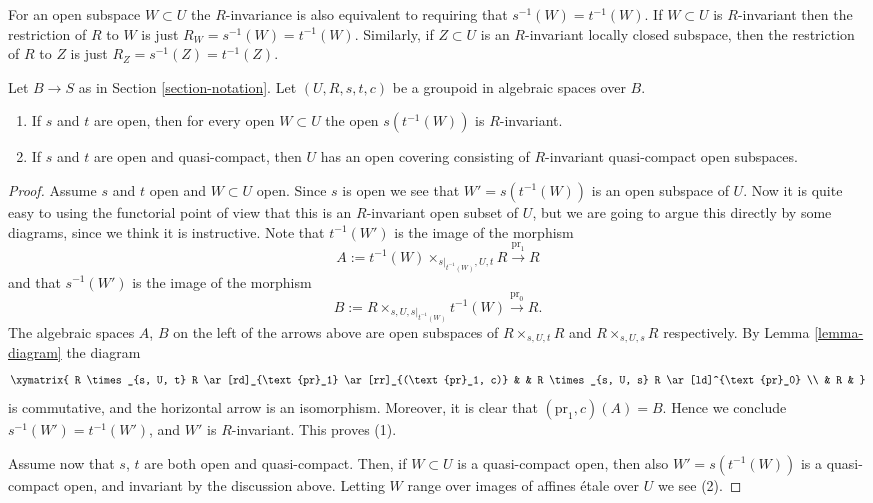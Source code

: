 \noindent
For an open subspace $W \subset U$ the $R$-invariance
is also equivalent to requiring that $s^{-1}(W) = t^{-1}(W)$.
If $W \subset U$ is $R$-invariant then the restriction of $R$ to
$W$ is just $R_W = s^{-1}(W) = t^{-1}(W)$. Similarly, if $Z \subset U$
is an $R$-invariant locally closed subspace, then the restriction of $R$
to $Z$ is just $R_Z = s^{-1}(Z) = t^{-1}(Z)$.

\begin{lemma}
\label{lemma-constructing-invariant-opens}
Let $B \to S$ as in Section \ref{section-notation}.
Let $(U, R, s, t, c)$ be a groupoid in algebraic spaces over $B$.
\begin{enumerate}
\item If $s$ and $t$ are open, then for every open $W \subset U$
the open $s(t^{-1}(W))$ is $R$-invariant.
\item If $s$ and $t$ are open and quasi-compact, then $U$ has an open
covering consisting of $R$-invariant quasi-compact open subspaces.
\end{enumerate}
\end{lemma}

\begin{proof}
Assume $s$ and $t$ open and $W \subset U$ open.
Since $s$ is open we see that $W' = s(t^{-1}(W))$ is an open subspace of $U$.
Now it is quite easy to using the functorial point of view
that this is an $R$-invariant open subset of $U$, but we are going to argue
this directly by some diagrams, since we think it is instructive.
Note that $t^{-1}(W')$ is the image of the morphism
$$
A := t^{-1}(W) \times_{s|_{t^{-1}(W)}, U, t} R
\xrightarrow{\text{pr}_1} R
$$
and that $s^{-1}(W')$ is the image of the morphism
$$
B := R \times_{s, U, s|_{t^{-1}(W)}} t^{-1}(W)
\xrightarrow{\text{pr}_0} R.
$$
The algebraic spaces $A$, $B$
on the left of the arrows above are open subspaces of
$R \times_{s, U, t} R$ and $R \times_{s, U, s} R$ respectively.
By Lemma \ref{lemma-diagram} the diagram
$$
\xymatrix{
R \times_{s, U, t} R \ar[rd]_{\text{pr}_1} \ar[rr]_{(\text{pr}_1, c)} & &
R \times_{s, U, s} R \ar[ld]^{\text{pr}_0} \\
& R &
}
$$
is commutative, and the horizontal arrow is an isomorphism. Moreover, it is
clear that $(\text{pr}_1, c)(A) = B$. Hence we conclude
$s^{-1}(W') = t^{-1}(W')$, and $W'$ is $R$-invariant. This proves (1).

\medskip\noindent
Assume now that $s$, $t$ are both open and quasi-compact.
Then, if $W \subset U$ is a quasi-compact open, then also
$W' = s(t^{-1}(W))$ is a quasi-compact open, and invariant by the
discussion above. Letting $W$ range over images of affines \'etale over $U$
we see (2).
\end{proof}





